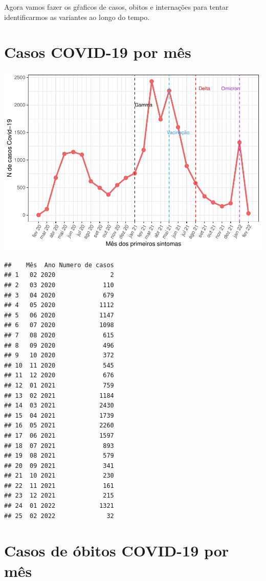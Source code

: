 \documentclass[
]{article}
\begin{document}
Agora vamos fazer os gŕaficos de casos, obitos e internações para tentar
identificarmos as variantes ao longo do tempo.

\hypertarget{casos-covid-19-por-muxeas}{%
\section{Casos COVID-19 por mês}\label{casos-covid-19-por-muxeas}}

\includegraphics{analises_variantes_files/figure-latex/unnamed-chunk-3-1.pdf}

\begin{verbatim}
##    Mês  Ano Numero de casos
## 1   02 2020               2
## 2   03 2020             110
## 3   04 2020             679
## 4   05 2020            1112
## 5   06 2020            1147
## 6   07 2020            1098
## 7   08 2020             615
## 8   09 2020             496
## 9   10 2020             372
## 10  11 2020             545
## 11  12 2020             676
## 12  01 2021             759
## 13  02 2021            1184
## 14  03 2021            2430
## 15  04 2021            1739
## 16  05 2021            2260
## 17  06 2021            1597
## 18  07 2021             893
## 19  08 2021             579
## 20  09 2021             341
## 21  10 2021             230
## 22  11 2021             161
## 23  12 2021             215
## 24  01 2022            1321
## 25  02 2022              32
\end{verbatim}

\hypertarget{casos-de-uxf3bitos-covid-19-por-muxeas}{%
\section{Casos de óbitos COVID-19 por
mês}\label{casos-de-uxf3bitos-covid-19-por-muxeas}}
\end{document}

